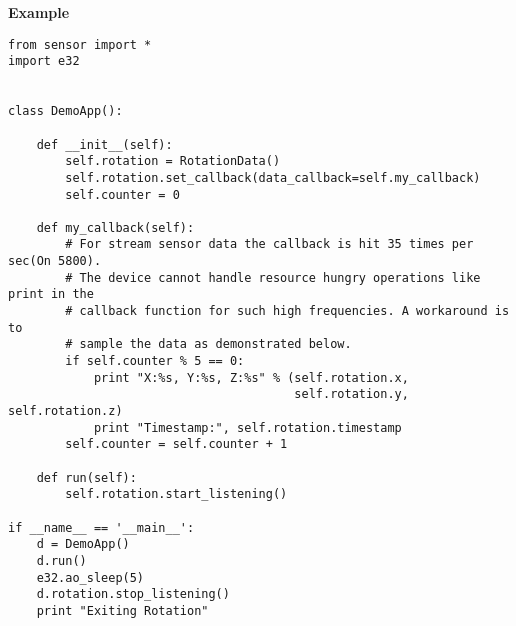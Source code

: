 {\bf Example} \break

\begin{verbatim}
from sensor import *
import e32


class DemoApp():

    def __init__(self):
        self.rotation = RotationData()
        self.rotation.set_callback(data_callback=self.my_callback)
        self.counter = 0

    def my_callback(self):
        # For stream sensor data the callback is hit 35 times per sec(On 5800).
        # The device cannot handle resource hungry operations like print in the
        # callback function for such high frequencies. A workaround is to
        # sample the data as demonstrated below.
        if self.counter % 5 == 0:
            print "X:%s, Y:%s, Z:%s" % (self.rotation.x,
                                        self.rotation.y, self.rotation.z)
            print "Timestamp:", self.rotation.timestamp
        self.counter = self.counter + 1

    def run(self):
        self.rotation.start_listening()

if __name__ == '__main__':
    d = DemoApp()
    d.run()
    e32.ao_sleep(5)
    d.rotation.stop_listening()
    print "Exiting Rotation"
\end{verbatim}


